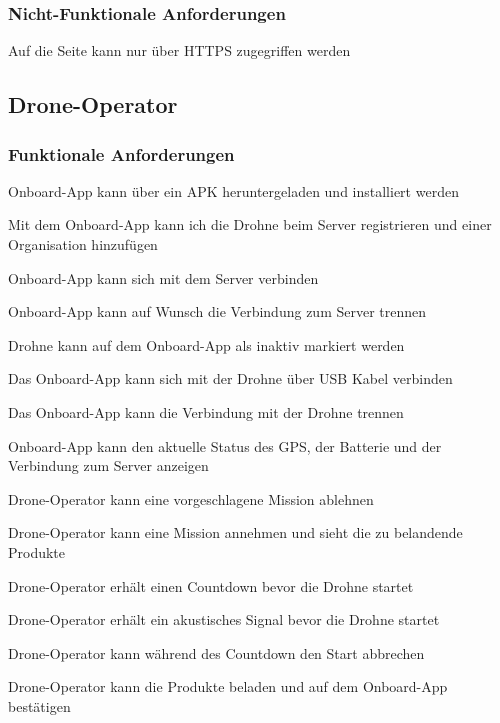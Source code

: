 \subsubsection{Nicht-Funktionale Anforderungen}
\begin{todolist}
	\item Auf die Seite kann nur über HTTPS zugegriffen werden
\end{todolist}

\subsection{Drone-Operator}
\subsubsection{Funktionale Anforderungen}
\begin{todolist}
	\item Onboard-App kann über ein APK heruntergeladen und installiert werden
	\item[\done] Mit dem Onboard-App kann ich die Drohne beim Server registrieren und einer Organisation hinzufügen
	\item[\done] Onboard-App kann sich mit dem Server verbinden
	\item Onboard-App kann auf Wunsch die Verbindung zum Server trennen
	\item Drohne kann auf dem Onboard-App als inaktiv markiert werden
	\item[\done] Das Onboard-App kann sich mit der Drohne über USB Kabel verbinden
	\item[\done] Das Onboard-App kann die Verbindung mit der Drohne trennen
	\item Onboard-App kann den aktuelle Status des GPS, der Batterie und der Verbindung zum Server anzeigen
	\item Drone-Operator kann eine vorgeschlagene Mission ablehnen
	\item Drone-Operator kann eine Mission annehmen und sieht die zu belandende Produkte
	\item Drone-Operator erhält einen Countdown bevor die Drohne startet
	\item Drone-Operator erhält ein akustisches Signal bevor die Drohne startet
	\item Drone-Operator kann während des Countdown den Start abbrechen
	\item Drone-Operator kann die Produkte beladen und auf dem Onboard-App bestätigen
\end{todolist}

